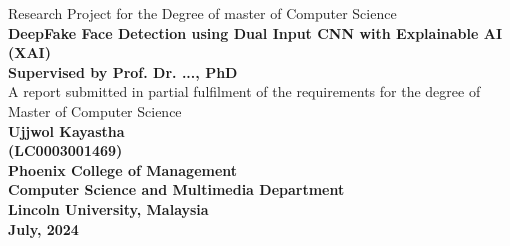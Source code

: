\pagestyle{empty}
\begin{center}
    \Large{Research Project for the Degree of master of Computer Science}\\[31pt]

    \LARGE{\textbf{DeepFake Face Detection using Dual Input CNN with Explainable AI (XAI)}}\\[93pt]

    \Large{\textbf{Supervised by Prof. Dr. ..., PhD }}\\[31pt]

    \Large{A report submitted in partial fulfilment of the requirements for the degree of Master of Computer Science}\\[93pt]

    \Large{\textbf{Ujjwol Kayastha \\ (LC0003001469)}}\\[31pt]

    \Large{\textbf{
            Phoenix College of Management \\
            Computer Science and Multimedia Department \\
            Lincoln University, Malaysia
        }}\\[31pt]

    \Large{\textbf{
            July, 2024
        }}\\[31pt]
\end{center}